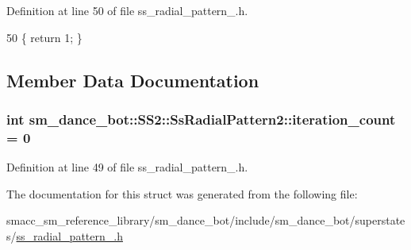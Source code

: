 Definition at line 50 of file ss\+\_\+radial\+\_\+pattern\+\_.\+h.


\begin{DoxyCode}
50 \{ \textcolor{keywordflow}{return} 1; \}
\end{DoxyCode}


\subsection{Member Data Documentation}
\subsubsection[{\texorpdfstring{iteration\+\_\+count}{iteration_count}}]{\setlength{\rightskip}{0pt plus 5cm}int sm\+\_\+dance\+\_\+bot\+::\+S\+S2\+::\+Ss\+Radial\+Pattern2\+::iteration\+\_\+count = 0}\hypertarget{structsm__dance__bot_1_1SS2_1_1SsRadialPattern2_afae1dd33bea98f712ba2938a35c0ddc1}{}\label{structsm__dance__bot_1_1SS2_1_1SsRadialPattern2_afae1dd33bea98f712ba2938a35c0ddc1}


Definition at line 49 of file ss\+\_\+radial\+\_\+pattern\+\_.\+h.



The documentation for this struct was generated from the following file\+:\begin{DoxyCompactItemize}
\item 
smacc\+\_\+sm\+\_\+reference\+\_\+library/sm\+\_\+dance\+\_\+bot/include/sm\+\_\+dance\+\_\+bot/superstates/\hyperlink{ss__radial__pattern__2_8h}{ss\+\_\+radial\+\_\+pattern\+\_.\+h}\end{DoxyCompactItemize}
